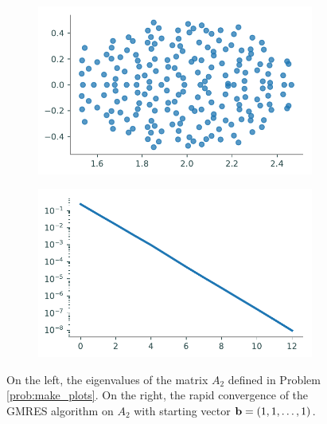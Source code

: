 \begin{problem}
\begin{figure}[H] %
\captionsetup[subfigure]{justification=centering}
\centering
\begin{subfigure}{.49\textwidth}
    \centering
    \includegraphics[width=\textwidth]{figures/scatter_gmres.pdf}
\end{subfigure}
%
\begin{subfigure}{.49\textwidth}
    \centering
    \includegraphics[width=\textwidth]{figures/gmres_convergence.pdf}
\end{subfigure}
\caption{On the left, the eigenvalues of the matrix $A_2$ defined in Problem \ref{prob:make_plots}.
On the right, the rapid convergence of the GMRES algorithm on $A_2$ with starting vector $\mathbf{b} = (1, 1, \ldots, 1)$.}
\label{fig:plot_gmres}
\end{figure}
\end{problem}

